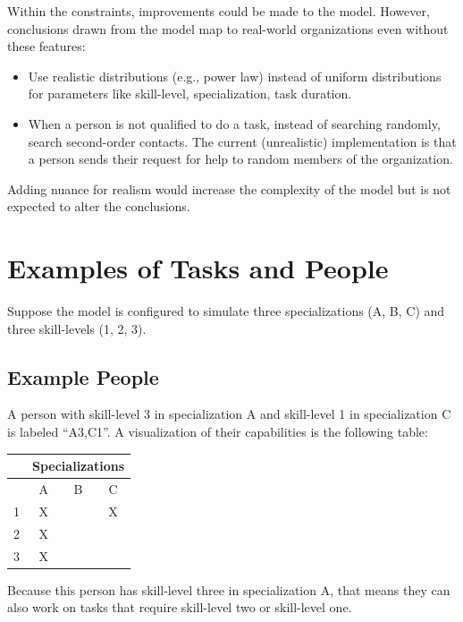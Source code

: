 Within the constraints, improvements could be made to the model. 
However,  conclusions drawn from the model map to real-world organizations even without these features: 
\begin{itemize}
    \item Use realistic distributions (e.g., power law) instead of uniform distributions for parameters like skill-level, specialization, task duration.
    \item When a person is not qualified to do a task, instead of searching randomly, search second-order contacts. The current (unrealistic) implementation is that a person sends their request for help to random members of the organization.
\end{itemize}
Adding nuance for realism would increase the complexity of the model but is not expected to alter the conclusions.

\section{Examples of Tasks and People}

Suppose the model is configured to simulate three specializations (A, B, C) and three skill-levels (1, 2, 3). 

\subsection*{Example People\label{sec:example-people}}

A person with skill-level 3 in specialization A and skill-level 1 in specialization C is labeled ``A3,C1''. A visualization of their capabilities is the following table:

\begin{center}
\begin{tabular}{c|c|c|c|}
&\multicolumn{3}{c}{\footnotesize Specializations}\\
\hline
& A & B & C \\
\hline
1 & X & & X \\
\hline
2 & X & & \\
\hline
3 & X & & \\
\hline
\end{tabular}
\end{center}

Because this person has skill-level three in specialization A, that means they can also work on tasks that require skill-level two or skill-level one.

